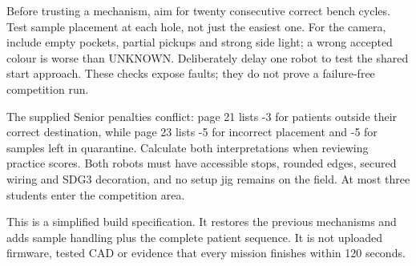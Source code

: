 \documentclass[10pt,a4paper]{article}
\begin{document}
Before trusting a mechanism, aim for twenty consecutive correct bench cycles. Test sample placement at each hole, not just the easiest one. For the camera, include empty pockets, partial pickups and strong side light; a wrong accepted colour is worse than UNKNOWN. Deliberately delay one robot to test the shared start approach. These checks expose faults; they do not prove a failure-free competition run.

The supplied Senior penalties conflict: page 21 lists -3 for patients outside their correct destination, while page 23 lists -5 for incorrect placement and -5 for samples left in quarantine. Calculate both interpretations when reviewing practice scores. Both robots must have accessible stops, rounded edges, secured wiring and SDG3 decoration, and no setup jig remains on the field. At most three students enter the competition area.

This is a simplified build specification. It restores the previous mechanisms and adds sample handling plus the complete patient sequence. It is not uploaded firmware, tested CAD or evidence that every mission finishes within 120 seconds.
\end{document}
